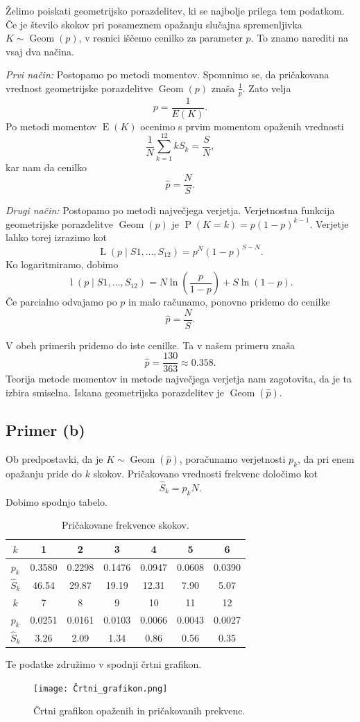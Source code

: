 \documentclass[a4paper,11pt]{article}
\DeclareMathOperator{\E}{E}
\DeclareMathOperator{\PP}{P}
\DeclareMathOperator{\Geom}{Geom}
\DeclareMathOperator{\Lver}{L}
\DeclareMathOperator{\lver}{l}
\begin{document}
Želimo poiskati geometrijsko porazdelitev, ki se najbolje prilega tem podatkom. 
Če je število skokov pri posameznem opažanju slučajna spremenljivka $K \sim \Geom(p)$, 
v resnici iščemo cenilko za parameter $p$.
To znamo narediti na vsaj dva načina.

\emph{Prvi način:} Postopamo po metodi momentov. 
Spomnimo se, da pričakovana vrednost geometrijske porazdelitve $\Geom(p)$ znaša $\frac{1}{p}$.
Zato velja
\[p = \frac{1}{E(K)}.\]
Po metodi momentov $\E(K)$ ocenimo s prvim momentom opaženih vrednosti 
\[\frac{1}{N} \sum_{k=1}^{12} k S_k = \frac{S}{N},\]
kar nam da cenilko
\[\hat{p} = \frac{N}{S}.\]

\emph{Drugi način:} Postopamo po metodi največjega verjetja.
Verjetnostna funkcija geometrijske porazdelitve $\Geom(p)$ je $\PP(K=k) = p(1-p)^{k-1}$.
Verjetje lahko torej izrazimo kot 
\[\Lver(p \mid S1, \ldots, S_{12}) = p^N (1-p)^{S - N}.\]
Ko logaritmiramo, dobimo 
\[\lver(p \mid S1, \ldots, S_{12}) = N \ln(\frac{p}{1-p}) + S \ln(1-p).\]
Če parcialno odvajamo po $p$ in malo računamo, ponovno pridemo do cenilke
\[\hat{p} = \frac{N}{S}.\]

V obeh primerih pridemo do iste cenilke.
Ta v našem primeru znaša 
\[\hat{p} = \frac{130}{363} \approx 0.358.\]
Teorija metode momentov in metode največjega verjetja nam zagotovita, da je ta izbira smiselna.
Iskana geometrijska porazdelitev je $\Geom(\hat{p})$.

\subsection*{Primer (b)}

Ob predpostavki, da je $K \sim \Geom(\hat{p})$, poračunamo verjetnosti $p_k$, da pri enem opažanju pride do $k$ skokov.
Pričakovano vrednosti frekvenc določimo kot
\[\hat{S}_k = p_k N.\]
Dobimo spodnjo tabelo.
\begin{table}[H]
    \centering
    \begin{tabular}{|c|c|c|c|c|c|c|}
    \hline
    $k$ & 1 & 2 & 3 & 4 & 5 & 6 \\ \hline
    $p_k$ & 0.3580 & 0.2298 & 0.1476 & 0.0947 & 0.0608 & 0.0390  \\ \hline
    $\hat{S}_k$ & 46.54 & 29.87 & 19.19 & 12.31 & 7.90 & 5.07 \\ \hline
    $k$ & 7 & 8 & 9 & 10 & 11 & 12 \\ \hline
    $p_k$ & 0.0251 & 0.0161 & 0.0103 & 0.0066 & 0.0043 & 0.0027 \\ \hline
    $\hat{S}_k$ & 3.26 & 2.09 & 1.34 & 0.86 & 0.56 & 0.35 \\ \hline
\end{tabular}
\caption{Pričakovane frekvence skokov.}
\label{PricakovaneFreq}
\end{table}
Te podatke združimo v spodnji črtni grafikon.
\begin{figure}[H]
    \centering
    \texttt{[image: Črtni\_grafikon.png]}
    \caption{Črtni grafikon opaženih in pričakovanih prekvenc.}
\end{figure}
\end{document}
